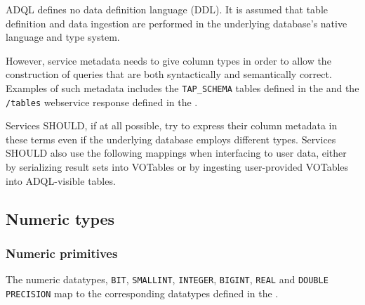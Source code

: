 \documentclass[11pt,a4paper]{ivoa}
\begin{document}
ADQL defines no data definition language (DDL).
It is assumed that table definition and data ingestion are performed in
the underlying database's native language and type system.

However, service metadata needs to give column types in order to allow the
construction of queries that are both syntactically and semantically correct.
Examples of such metadata includes the \verb:TAP_SCHEMA: tables defined in the
\TAPSpec{} and the \verb:/tables: webservice response defined in the
\VOSISpec{}.

Services SHOULD, if at all possible, try to express their column metadata in
these terms even if the underlying database employs different types.
Services SHOULD also use the following mappings when interfacing to user data,
either by serializing result sets into VOTables or by ingesting user-provided
VOTables into ADQL-visible tables.

\subsection{Numeric types}
\label{sec:types.numeric}

\subsubsection{Numeric primitives}
\label{sec:types.numeric.primitive}

The numeric datatypes, \verb:BIT:, \verb:SMALLINT:, \verb:INTEGER:,
\verb:BIGINT:, \verb:REAL:  \linebreak and \verb:DOUBLE PRECISION: map to the
corresponding datatypes defined in the \VOTableSpec{}.
\end{document}

